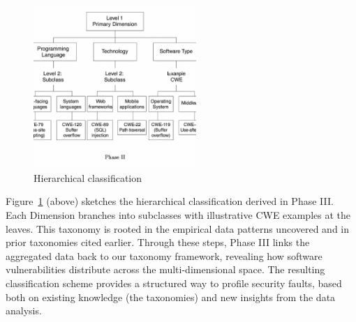 \begin{figure}[!h]
	\centering
    \includegraphics[width=0.55\textwidth]{figures/chapter_2/classification-hierarchy.png}
	\caption{Hierarchical classification}
	\label{fig:classification-hierarchy}
\end{figure}


Figure~\ref{fig:classification-hierarchy} (above) sketches the hierarchical classification derived in Phase III. Each Dimension branches into subclasses with illustrative CWE examples at the leaves. This taxonomy is rooted in the empirical data patterns uncovered and in prior taxonomies cited earlier. Through these steps, Phase III links the aggregated data back to our taxonomy framework, revealing how software vulnerabilities distribute across the multi-dimensional space. The resulting classification scheme provides a structured way to profile security faults, based both on existing knowledge (the taxonomies) and new insights from the data analysis.